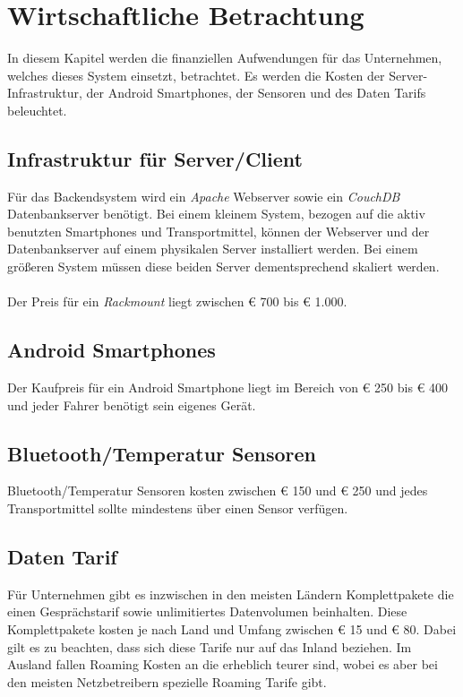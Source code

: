 \section{Wirtschaftliche Betrachtung}
\label{sec:business}

In diesem Kapitel werden die finanziellen Aufwendungen für das Unternehmen, welches dieses System einsetzt, betrachtet.
Es werden die Kosten der Server-Infrastruktur, der Android Smartphones, der Sensoren und des Daten Tarifs beleuchtet.

\subsection{Infrastruktur für Server/Client}

Für das Backendsystem wird ein \emph{Apache} Webserver sowie ein \emph{CouchDB} Datenbankserver benötigt.
Bei einem kleinem System, bezogen auf die aktiv benutzten Smartphones und Transportmittel, können der Webserver und der Datenbankserver auf
einem physikalen Server installiert werden. Bei einem größeren System müssen diese beiden Server dementsprechend skaliert werden.
\\ \\
Der Preis für ein \emph{Rackmount} liegt zwischen € 700 bis € 1.000.

\subsection{Android Smartphones}

Der Kaufpreis für ein Android Smartphone liegt im Bereich von € 250 bis € 400 und jeder Fahrer benötigt sein eigenes Gerät.

\subsection{Bluetooth/Temperatur Sensoren}

Bluetooth/Temperatur Sensoren kosten zwischen € 150 und € 250 und jedes Transportmittel sollte mindestens über einen Sensor verfügen.

\subsection{Daten Tarif}

Für Unternehmen gibt es inzwischen in den meisten Ländern Komplettpakete die einen Gesprächstarif sowie unlimitiertes Datenvolumen beinhalten.
Diese Komplettpakete kosten je nach Land und Umfang zwischen € 15 und € 80. Dabei gilt es zu beachten, dass sich diese Tarife nur auf das Inland beziehen.
Im Ausland fallen Roaming Kosten an die erheblich teurer sind, wobei es aber bei den meisten Netzbetreibern spezielle Roaming Tarife gibt.

